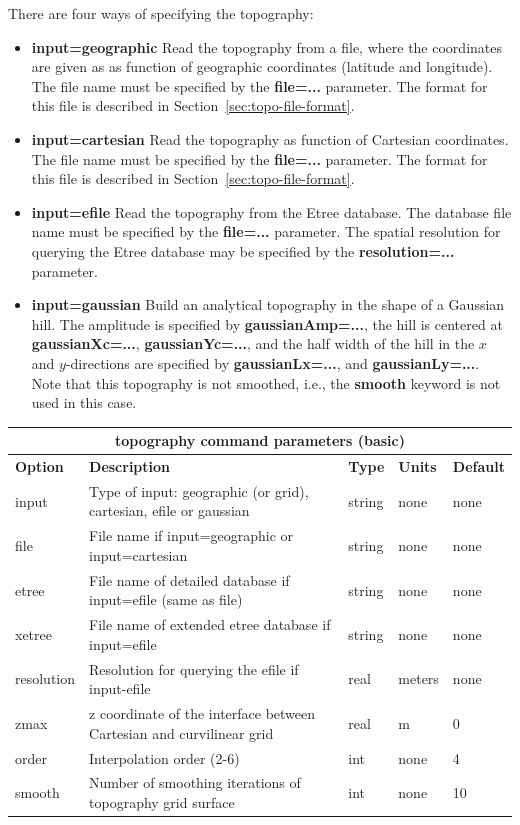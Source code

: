 \documentclass[11pt]{report}
\begin{document}
There are four ways of specifying the topography:
\begin{itemize}
\item {\bf input=geographic} Read the topography from a file, where the coordinates are given as as
  function of geographic coordinates (latitude and longitude). The file name must be specified by
  the {\bf file=...} parameter. The format for this file is described in Section~\ref{sec:topo-file-format}.
\item {\bf input=cartesian} Read the topography as function of Cartesian coordinates. The file name
   must be specified by the {\bf file=...} parameter. The format for this file is described in
   Section~\ref{sec:topo-file-format}.
\item {\bf input=efile} Read the topography from the Etree database. The database file name
   must be specified by the {\bf file=...} parameter. The spatial resolution for querying the Etree
  database may be specified by the {\bf resolution=...} parameter.
\item {\bf input=gaussian} Build an analytical topography in the shape of a Gaussian hill. The
  amplitude is specified by {\bf gaussianAmp=...}, the hill is centered at {\bf gaussianXc=...},
  {\bf gaussianYc=...}, and the half width of the hill in the $x$ and $y$-directions are specified by 
   {\bf gaussianLx=...}, and {\bf gaussianLy=...}. Note that this topography is not smoothed, i.e.,
   the {\bf smooth} keyword is not used in this case.
\end{itemize}
%
\begin{center}
\begin{tabular}{|l|p{8cm}|l|l|l|} \hline
\multicolumn{5}{|c|}{\bf topography command parameters (basic)}\\ \hline
\bf{Option} & \bf{Description} & \bf{Type} & \bf{Units} & \bf{Default}\\ \hline \hline
%
input & Type of input: geographic (or grid), cartesian, efile or gaussian & string & none & none\\ \hline
%
file & File name if input=geographic or input=cartesian & string & none & none\\ \hline
%
etree & File name of detailed database if input=efile (same as file) & string & none & none\\ \hline
%
xetree & File name of extended etree database if input=efile & string & none & none\\ \hline
%
resolution & Resolution for querying the efile if input-efile & real & meters & none \\ \hline
%
zmax & z coordinate of the interface between  Cartesian and curvilinear grid& real &  m & 0\\ \hline
%
order & Interpolation order (2-6) & int & none & 4\\ \hline
%
smooth & Number of smoothing iterations of topography grid surface & int & none & 10 \\ \hline
\end{tabular}
\end{center}
\end{document}

